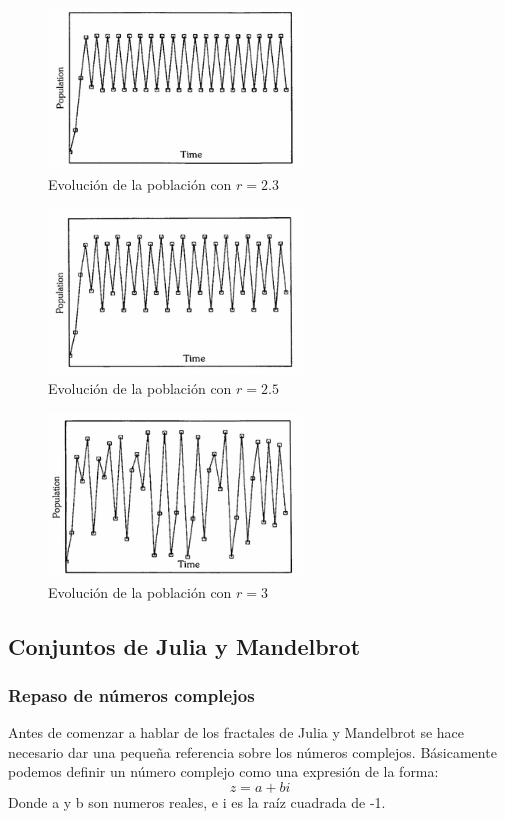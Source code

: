\begin{figure}[hbtp]
\centering
\includegraphics[width = 0.6\textwidth]{img/r2_3.png}
\caption{Evolución de la población con $r=2.3$}
\label{fig:r2_3}
\end{figure}
\begin{figure}[hbtp]
\centering
\includegraphics[width = 0.6\textwidth]{img/r2_5.png}
\caption{Evolución de la población con $r=2.5$}
\label{fig:r2_5}
\end{figure}
\begin{figure}[hbtp]
\centering
\includegraphics[width = 0.6\textwidth]{img/r3.png}
\caption{Evolución de la población con $r=3$}
\label{fig:r3}
\end{figure}

\subsection{Conjuntos de Julia y Mandelbrot}

\subsubsection{Repaso de números complejos}
Antes de comenzar a hablar de los fractales de Julia y Mandelbrot se hace necesario dar una pequeña referencia sobre los números complejos. Básicamente podemos definir un número complejo como una expresión de la forma:
\[z=a +bi\]
Donde a y b son numeros reales, e i es la raíz cuadrada de -1.

